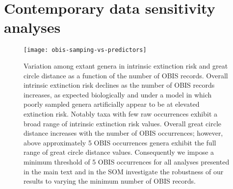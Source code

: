 \documentclass[11pt]{article}
\begin{document}
\clearpage

\section{Contemporary data sensitivity analyses}

\begin{figure}[htbp]
\begin{center}
\texttt{[image: obis-samping-vs-predictors]}
\caption{Variation among extant genera in intrinsic extinction risk and great circle distance as a function of the number of OBIS records. Overall intrinsic extinction risk declines as the number of OBIS records increases, as expected biologically and under a model in which poorly sampled genera artificially appear to be at elevated extinction risk. Notably taxa with few raw occurrences exhibit a broad range of intrinsic extinction risk values. Overall great circle distance increases with the number of OBIS occurrences; however, above approximately 5 OBIS occurrences genera exhibit the full range of great circle distance values. Consequently we impose a minimum threshold of 5 OBIS occurrences for all analyses presented in the main text and in the SOM investigate the robustness of our results to varying the minimum number of OBIS records.}
\label{fig:obis-sampling-vs-predictors}
\end{center}
\end{figure}

\clearpage

%

\end{document}
